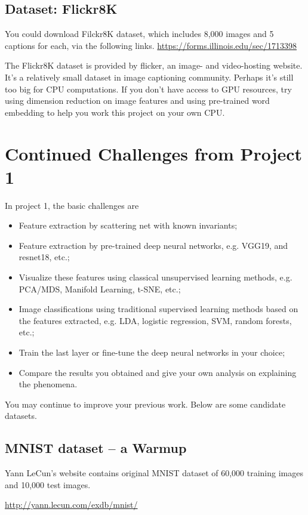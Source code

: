 \documentclass[11pt]{article}
\begin{document}
\subsection{Dataset: Flickr8K}
You could download Filckr8K dataset, which includes 8,000 images and 5 captions for each, via the following links.
\url{https://forms.illinois.edu/sec/1713398}

The Flickr8K dataset is provided by flicker, an image- and video-hosting website. It's a relatively small dataset in image captioning community. Perhaps it's still too big for CPU computations. If you don't have access to GPU resources,  try using dimension reduction on image features and using pre-trained word embedding to help you work this project on your own CPU.

\section{Continued Challenges from Project 1}
In project 1, the basic challenges are
\begin{itemize}
\item Feature extraction by scattering net with known invariants; 
\item Feature extraction by pre-trained deep neural networks, e.g. VGG19, and resnet18, etc.;
\item Visualize these features using classical unsupervised learning methods, e.g. PCA/MDS, Manifold Learning, t-SNE, etc.; 
\item Image classifications using traditional supervised learning methods based on the features extracted, e.g. LDA, logistic regression, SVM, random forests, etc.;
\item Train the last layer or fine-tune the deep neural networks in your choice; 
\item Compare the results you obtained and give your own analysis on explaining the phenomena.
\end{itemize}

You may continue to improve your previous work. Below are some candidate datasets. 

\subsection{MNIST dataset -- a Warmup}

Yann LeCun's website contains original MNIST dataset of 60,000 training images and 10,000 test images. 

\url{http://yann.lecun.com/exdb/mnist/}
\end{document}
